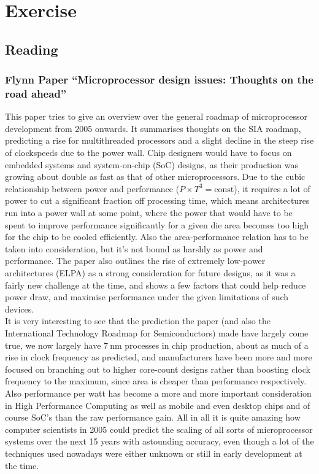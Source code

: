 \documentclass[]{scrartcl}
\newcommand{\exercise}{Exercise \thesection}
\begin{document}
\section*{\exercise}
\subsection{Reading}
\subsubsection{Flynn Paper ``Microprocessor design issues: Thoughts on the road ahead''}
This paper tries to give an overview over the general roadmap of microprocessor development from 2005 onwards. It summarises thoughts on the SIA roadmap, predicting a rise for multithreaded processors and a slight decline in the steep rise of clockspeeds due to the power wall. Chip designers would have to focus on embedded systems and system-on-chip (SoC) designs, as their production was growing about double as fast as that of other microprocessors. Due to the cubic relationship between power and performance ($ P\times T^3 = \text{const} $), it requires a lot of power to cut a significant fraction off processing time, which means architectures run into a power wall at some point, where the power that would have to be spent to improve performance significantly for a given die area becomes too high for the chip to be cooled efficiently. 
Also the area-performance relation has to be taken into consideration, but it's not bound as harshly as power and performance. The paper also outlines the rise of extremely low-power architectures (ELPA) as a strong consideration for future designs, as it was a fairly new challenge at the time, and shows a few factors that could help reduce power draw, and maximise performance under the given limitations of such devices.
\\
It is very interesting to see that the prediction the paper (and also the International Technology Roadmap for Semiconductors) made have largely come true, we now largely have $ \SI{7}{\nano\meter} $ processes in chip production, about as much of a rise in clock frequency as predicted, and manufacturers have been more and more focused on branching out to higher core-count designs rather than boosting clock frequency to the maximum, since area is cheaper than performance respectively. Also performance per watt has become a more and more important consideration in High Performance Computing as well as mobile and even desktop chips and of course SoC's than the raw performance gain. All in all it is quite amazing how computer scientists in 2005 could predict the scaling of all sorts of microprocessor systems over the next 15 years with astounding accuracy, even though a lot of the techniques used nowadays were either unknown or still in early development at the time.
\end{document}
